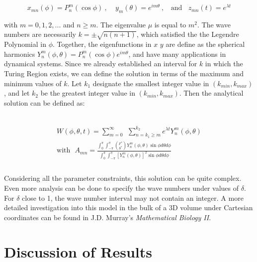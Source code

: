 \documentclass[12pt]{article}
\begin{document}
\begin{equation}
\label{eigenfunctions}
    x_{mn}(\phi)=P_n^m(\cos{\phi})~,~~~~~ y_m(\theta)=e^{im\theta}~,~~~~ \text{and} ~~~~ z_{mn}(t)=e^{\lambda t}
    \end{equation} 
    
\noindent with $m=0,1,2,...$ and $n\geq m$. The eigenvalue $\mu$ is equal to $m^2$. The wave numbers are necessarily $k=\pm \sqrt{n(n+1)}$, which satisfied the the Legendre Polynomial in $\phi$. Together, the eigenfunctions in $x$ $y$ are define as the spherical harmonics $Y_n^m(\phi,\theta) = P_n^m(\cos{\phi})e^{im\theta}$, and have many applications in dynamical systems.\cite{Frye2012} Since we already established an interval for $k$ in which the Turing Region exists, we can define the solution in terms of the maximum and minimum values of $k$. Let $k_1$ designate the smallest integer value in $(k_{min},k_{max})$, and let $k_2$ be the greatest integer value in $(k_{min},k_{max})$. Then the analytical solution can be defined as:

\\
\begin{equation}
\label{asol}
    \begin{aligned}
        W(\phi,\theta,t)=\sum_{m=0}^\infty ~~\sum_{n=k_{1}\geq m}^{k_{2}} e^{\lambda t}Y_n^m(\phi,\theta) \\
        \text{with} ~~~ A_{mn}=\frac{\int_0^\pi\int_{-\pi}^\pi \left(_{S^*}^{F^*}\right)Y_n^m(\phi,\theta)\sin{\phi}d\theta d\phi}{\int_0^\pi\int_{-\pi}^\pi [Y_n^m(\phi,\theta)]^2\sin{\phi}d\theta d\phi}\\
    \end{aligned}
\end{equation}
\\

       

Considering all the parameter constraints, this solution can be quite complex. Even more analysis can be done to specify the wave numbers under values of $\delta$. For $\delta$ close to 1, the wave number interval may not contain an integer. A more detailed investigation into this model in the bulk of a 3D volume under Cartesian coordinates can be found in J.D. Murray's \textit{Mathematical Biology II}.\cite{MurrayII2003}

\section{Discussion of Results}\label{discussion}
\end{document}
